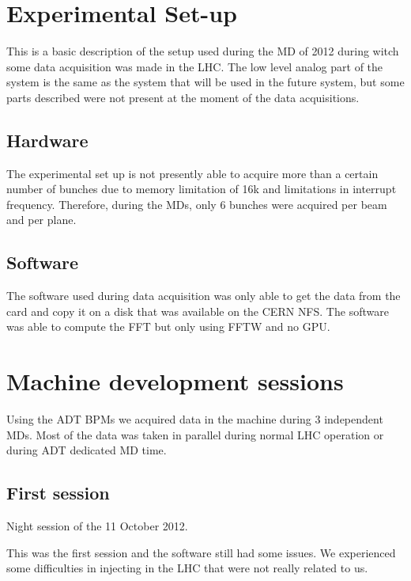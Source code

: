 \section{Experimental Set-up}

This is a basic description of the setup used during the \gls{MD} of 2012 during witch some data acquisition was made in the \gls{LHC}. The low level analog part of the system is the same as the system that will be used in the future system, but some parts described were not present at the moment of the data acquisitions.

\subsection{Hardware}

The experimental set up is not presently able to acquire more than a certain number of bunches due to memory limitation of 16k and limitations in interrupt frequency. Therefore, during the \glspl{MD}, only 6 bunches were acquired per beam and per plane.

\subsection{Software}

The software used during data acquisition was only able to get the data from the card and copy it on a disk that was available on the \gls{CERN} \gls{NFS}. The software was able to compute the \gls{FFT} but only using \gls{FFTW} and no \gls{GPU}.

\section{Machine development sessions}

Using the \gls{ADT} \glspl{BPM} we acquired data in the machine during 3 independent \glspl{MD}. Most of the data was taken in parallel during normal LHC operation or during \gls{ADT} dedicated \gls{MD} time.

\subsection{First session}

Night session of the 11 October 2012.

This was the first session and the software still had some issues. We experienced some difficulties in injecting in the \gls{LHC} that were not really related to us.

